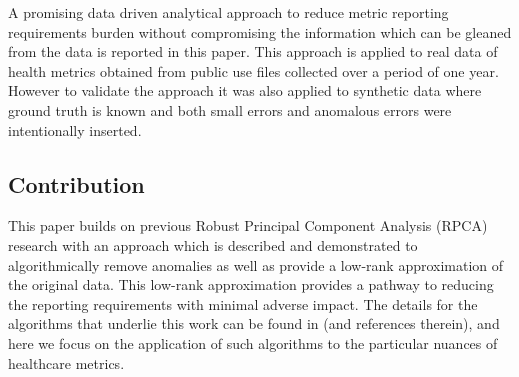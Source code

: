 \documentclass[conference]{IEEEtran}
\begin{document}
A promising data driven analytical approach to reduce metric reporting requirements burden without compromising the information which can be gleaned from the data is reported in this paper. This approach is applied to real data of  health metrics obtained from public use files collected over a period of one year.  However to validate the approach it was also applied to synthetic data where ground truth is known and both small errors and anomalous errors were intentionally inserted.


\subsection{Contribution}
This paper builds on previous Robust Principal Component Analysis (RPCA) research with an approach which is described and demonstrated to algorithmically remove anomalies as well as provide a low-rank approximation of the original data.  This low-rank approximation provides a pathway to reducing the reporting requirements with minimal adverse impact.  The details for the algorithms that underlie this work can be found in \cite{paffenroth2018robust,Paffenroth2012} (and references therein), and here we focus on the application of such algorithms to the particular nuances of healthcare metrics. 
\end{document}
